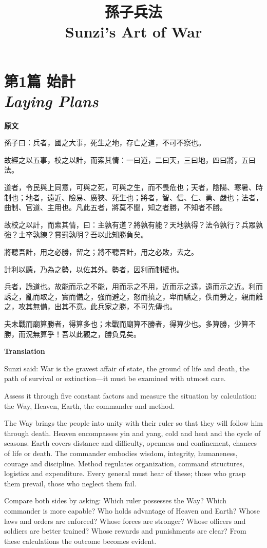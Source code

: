 \documentclass[12pt]{book}
\title{{\sffamily 孫子兵法}\\[1ex]\large Sunzi's Art of War}
\author{}
\date{}
\newcommand{\chapterentry}[4]{%
  \chapter[\texorpdfstring{#1}{#1}]{\texorpdfstring{#1\\\Large\textit{#2}}{#1 — #2}}%
  \noindent\textbf{原文}\par
  #3

  \bigskip
  \noindent\textbf{Translation}\par
  #4
}
\begin{document}
\frontmatter
\maketitle
\tableofcontents
\mainmatter

\chapterentry{第1篇 始計}{Laying Plans}{%
孫子曰：兵者，國之大事，死生之地，存亡之道，不可不察也。

故經之以五事，校之以計，而索其情：一曰道，二曰天，三曰地，四曰將，五曰法。

道者，令民與上同意，可與之死，可與之生，而不畏危也；天者，陰陽、寒暑、時制也；地者，遠近、險易、廣狹、死生也；將者，智、信、仁、勇、嚴也；法者，曲制、官道、主用也。凡此五者，將莫不聞，知之者勝，不知者不勝。

故校之以計，而索其情，曰：主孰有道？將孰有能？天地孰得？法令孰行？兵眾孰強？士卒孰練？賞罰孰明？吾以此知勝負矣。

將聽吾計，用之必勝，留之；將不聽吾計，用之必敗，去之。

計利以聽，乃為之勢，以佐其外。勢者，因利而制權也。

兵者，詭道也。故能而示之不能，用而示之不用，近而示之遠，遠而示之近。利而誘之，亂而取之，實而備之，強而避之，怒而撓之，卑而驕之，佚而勞之，親而離之，攻其無備，出其不意。此兵家之勝，不可先傳也。

夫未戰而廟算勝者，得算多也；未戰而廟算不勝者，得算少也。多算勝，少算不勝，而況無算乎！吾以此觀之，勝負見矣。}{%
Sunzi said: War is the gravest affair of state, the ground of life and death, the path of survival or extinction—it must be examined with utmost care.

Assess it through five constant factors and measure the situation by calculation: the Way, Heaven, Earth, the commander and method.

The Way brings the people into unity with their ruler so that they will follow him through death. Heaven encompasses yin and yang, cold and heat and the cycle of seasons. Earth covers distance and difficulty, openness and confinement, chances of life or death. The commander embodies wisdom, integrity, humaneness, courage and discipline. Method regulates organization, command structures, logistics and expenditure. Every general must hear of these; those who grasp them prevail, those who neglect them fail.

Compare both sides by asking: Which ruler possesses the Way? Which commander is more capable? Who holds advantage of Heaven and Earth? Whose laws and orders are enforced? Whose forces are stronger? Whose officers and soldiers are better trained? Whose rewards and punishments are clear? From these calculations the outcome becomes evident.

}
\end{document}
